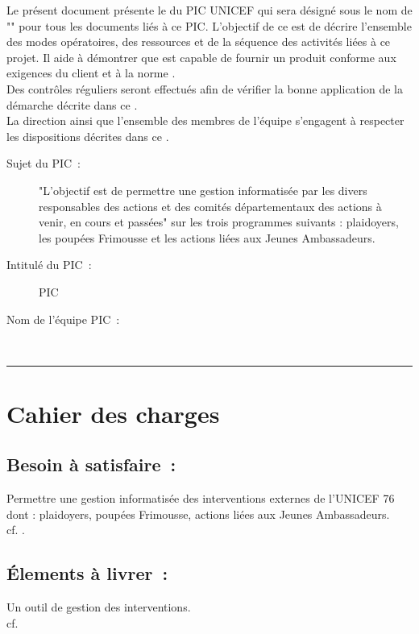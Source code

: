		Le présent document présente le \PQ{} du PIC UNICEF qui sera désigné sous le nom de "\nomEquipe" pour tous les documents liés à ce PIC. L'objectif de ce \PQ{} est de décrire l'ensemble des modes opératoires, des ressources et de la séquence des activités liées à ce projet. Il aide à démontrer que \nomEquipe{} est capable de fournir un produit conforme aux exigences du client et à la norme \ISO . \\
		
		Des contrôles réguliers seront effectués afin de vérifier la bonne application de la démarche décrite dans ce \PQ .\\
		
		La direction ainsi que l'ensemble des membres de l'équipe \nomEquipe{} s'engagent à respecter les dispositions décrites dans ce \PQ .\\ 
		

		
	\begin{description}
		\item[Sujet du PIC~:] "L'objectif est de permettre une gestion informatisée par les divers responsables des actions et des comités départementaux des actions à venir, en cours et passées" sur les trois programmes suivants : plaidoyers, les poupées Frimousse et les actions liées aux Jeunes Ambassadeurs. \\	
		\item[Intitulé du PIC~:] PIC \nomPIC \\	
		\item[Nom de l'équipe PIC~:] \nomEquipe \\
	\end{description}


\noindent\hfil\rule{\textwidth}{.4pt}\hfil


		
\section*{Cahier des charges}
		\subsection*{Besoin à satisfaire~:} 
		Permettre une gestion informatisée des interventions externes de l'UNICEF 76 dont : plaidoyers, poupées Frimousse, actions liées aux Jeunes Ambassadeurs.
		\\	cf. \DSE . 		
		\subsection*{Élements à livrer~:}
		Un outil de gestion des interventions.
		\\	cf. \DSE
			
